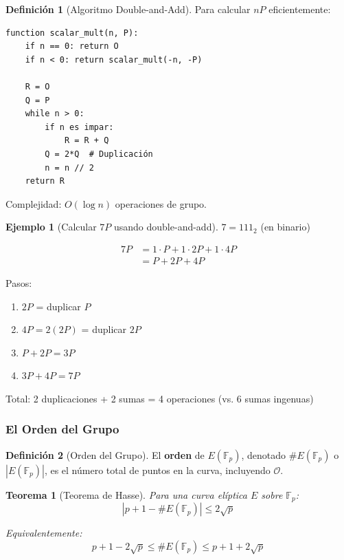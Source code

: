 \documentclass[11pt,a4paper,twoside,openright]{book}
\theoremstyle{definition}
\newtheorem{definition}{Definición}[chapter]
\newtheorem{example}{Ejemplo}[chapter]
\theoremstyle{plain}
\newtheorem{theorem}{Teorema}[chapter]
\theoremstyle{remark}
\begin{document}
\begin{definition}[Algoritmo Double-and-Add]
Para calcular $nP$ eficientemente:
\begin{verbatim}
function scalar_mult(n, P):
    if n == 0: return O
    if n < 0: return scalar_mult(-n, -P)
    
    R = O
    Q = P
    while n > 0:
        if n es impar:
            R = R + Q
        Q = 2*Q  # Duplicación
        n = n // 2
    return R
\end{verbatim}

Complejidad: $O(\log n)$ operaciones de grupo.
\end{definition}

\begin{example}[Calcular $7P$ usando double-and-add]
$7 = 111_2$ (en binario)

\begin{align}
7P &= 1 \cdot P + 1 \cdot 2P + 1 \cdot 4P \\
   &= P + 2P + 4P
\end{align}

Pasos:
\begin{enumerate}
    \item $2P$ = duplicar $P$
    \item $4P = 2(2P)$ = duplicar $2P$
    \item $P + 2P = 3P$
    \item $3P + 4P = 7P$
\end{enumerate}

Total: 2 duplicaciones + 2 sumas = 4 operaciones (vs. 6 sumas ingenuas)
\end{example}

\subsubsection{El Orden del Grupo}

\begin{definition}[Orden del Grupo]
El \textbf{orden} de $E(\mathbb{F}_p)$, denotado $\#E(\mathbb{F}_p)$ o $|E(\mathbb{F}_p)|$, es el número total de puntos en la curva, incluyendo $\mathcal{O}$.
\end{definition}

\begin{theorem}[Teorema de Hasse]
Para una curva elíptica $E$ sobre $\mathbb{F}_p$:
\[
|p + 1 - \#E(\mathbb{F}_p)| \leq 2\sqrt{p}
\]

Equivalentemente:
\[
p + 1 - 2\sqrt{p} \leq \#E(\mathbb{F}_p) \leq p + 1 + 2\sqrt{p}
\]
\end{theorem}
\end{document}
